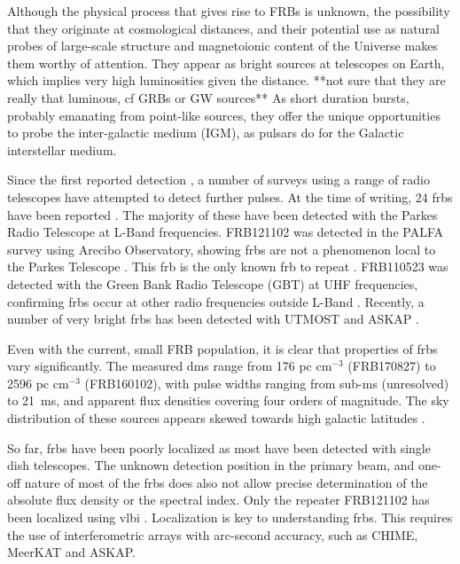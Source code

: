 \documentclass[a4paper,fleqn,usenatbib]{mnras}
\begin{document}
Although the physical process that gives rise to FRBs is unknown,
the possibility that they originate at 
cosmological distances, and their potential use as natural probes of
large-scale structure and magnetoionic content of the Universe
makes them worthy of attention. They appear as
bright sources at telescopes on Earth, which implies very high
luminosities given the distance. **not sure that they are really that
luminous, cf GRBs or GW sources** As short duration bursts, probably
emanating from point-like sources, they offer the unique opportunities
to probe the inter-galactic medium (IGM), as pulsars do for the Galactic
interstellar medium.

Since the first reported detection \citep{2007Sci...318..777L}, a
number of surveys using a range of radio telescopes have attempted to
detect further pulses. At the time of writing, 24 \glspl{frb} have
been reported \citep[for an up-to-date list,
  see][]{2016PASA...33...45P}. The majority of these have been
detected with the Parkes Radio Telescope at L-Band
frequencies. FRB121102 was detected in the PALFA survey using Arecibo
Observatory, showing \glspl{frb} are not a phenomenon local to the
Parkes Telescope \citep{2014ApJ...790..101S}. This \gls{frb} is the
only known \gls{frb} to repeat \citep{2016ApJ...833..177S}. FRB110523
was detected with the Green Bank Radio Telescope (GBT) at UHF
frequencies, confirming \glspl{frb} occur at other radio frequencies
outside L-Band \citep{2015Natur.528..523M}.  Recently, a number of
very bright \glspl{frb} has been detected with UTMOST
\citep{2017MNRAS.468.3746C,atel10697} and ASKAP
\citep{2017ApJ...841L..12B}.

Even with the current, small FRB population, it is clear that
properties of \glspl{frb} vary significantly. The measured \glspl{dm}
range from 176 pc cm$^{-3}$ (FRB170827) to 2596 pc cm$^{-3}$
(FRB160102), with pulse widths ranging from sub-ms (unresolved) to
21~ms, and apparent flux densities covering four orders of
magnitude. The sky distribution of these sources appears skewed
towards high galactic latitudes \citep{2015MNRAS.451.3278M}.

So far, \glspl{frb} have been poorly localized as most have been
detected with single dish telescopes. The unknown detection position
in the primary beam, and one-off nature of most of the \glspl{frb}
does also not allow precise determination of the absolute flux density
or the spectral index. Only the repeater FRB121102 has been localized
using \gls{vlbi} \citep{2017ApJ...834L...8M,
  2017ApJ...834L...7T}. Localization is key to understanding
\glspl{frb}. This requires the use of interferometric arrays with
arc-second accuracy, such as CHIME, MeerKAT and ASKAP. 
\end{document}
